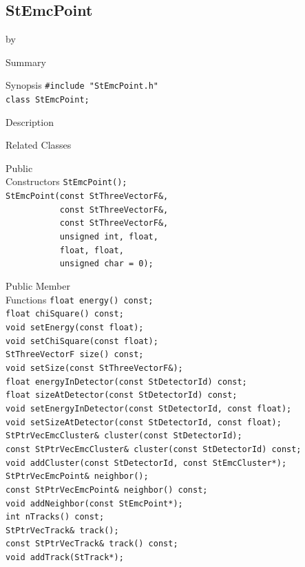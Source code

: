 \documentclass[twoside]{article}
\newcommand{\entrylabel}[1]{\mbox{\textbf{{#1}}}\hfil}%
\newenvironment{entry}
{\begin{list}{}%
    {\renewcommand{\makelabel}{\entrylabel}%
     \setlength{\labelwidth}{90pt}%
     \setlength{\leftmargin}{\labelwidth}
     \advance\leftmargin by \labelsep%
      }%
    }%
  {\end{list}}
\newcommand{\Entrylabel}[1]%
{\raisebox{0pt}[1ex][0pt]{\makebox[\labelwidth][l]%
    {\parbox[t]{\labelwidth}{\hspace{0pt}\textbf{{#1}}}}}}
\newenvironment{Entry}%
{\renewcommand{\entrylabel}{\Entrylabel}\begin{entry}}%
  {\end{entry}}
\begin{document}
\subsection{StEmcPoint}
\label{sec:StEmcPoint}
\begin{Entry}
\item[Summary]
\item[Synopsis]
    \verb+#include "StEmcPoint.h"+\\
    \verb+class StEmcPoint;+\\
\item[Description]
\item[Related Classes]
\item[Public\\ Constructors]
    \verb+StEmcPoint();+\\
    \verb+StEmcPoint(const StThreeVectorF&,+\\
    \verb+           const StThreeVectorF&,+\\
    \verb+           const StThreeVectorF&,+\\
    \verb+           unsigned int, float,+\\
    \verb+           float, float,+\\
    \verb+           unsigned char = 0);+\\
\item[Public Member\\ Functions]
    \verb+float energy() const;+\\
    \verb+float chiSquare() const;+\\
    \verb+void setEnergy(const float);+\\
    \verb+void setChiSquare(const float);+\\
    \verb+StThreeVectorF size() const;+\\
    \verb+void setSize(const StThreeVectorF&);+\\
    \verb+float energyInDetector(const StDetectorId) const;+\\
    \verb+float sizeAtDetector(const StDetectorId) const;+\\
    \verb+void setEnergyInDetector(const StDetectorId, const float);+\\
    \verb+void setSizeAtDetector(const StDetectorId, const float);+\\
    \verb+StPtrVecEmcCluster& cluster(const StDetectorId);+\\
    \verb+const StPtrVecEmcCluster& cluster(const StDetectorId) const;+\\
    \verb+void addCluster(const StDetectorId, const StEmcCluster*);+\\
    \verb+StPtrVecEmcPoint& neighbor();+\\
    \verb+const StPtrVecEmcPoint& neighbor() const;+\\
    \verb+void addNeighbor(const StEmcPoint*);+\\
    \verb+int nTracks() const;+\\
    \verb+StPtrVecTrack& track();+\\
    \verb+const StPtrVecTrack& track() const;+\\
    \verb+void addTrack(StTrack*);+\\
\end{Entry}
\end{document}
